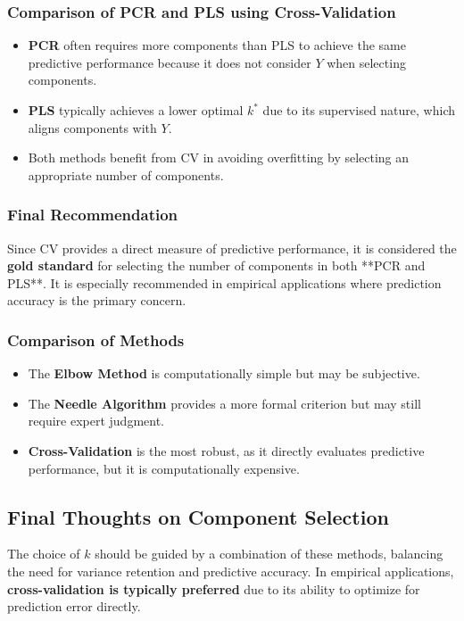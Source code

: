 \documentclass[11pt,twoside,a4paper]{article}
\begin{document}
\subsubsection{Comparison of PCR and PLS using Cross-Validation}
\begin{itemize}
    \item \textbf{PCR} often requires more components than PLS to achieve the same predictive performance because it does not consider \( Y \) when selecting components.
    \item \textbf{PLS} typically achieves a lower optimal \( k^* \) due to its supervised nature, which aligns components with \( Y \).
    \item Both methods benefit from CV in avoiding overfitting by selecting an appropriate number of components.
\end{itemize}

\subsubsection{Final Recommendation}
Since CV provides a direct measure of predictive performance, it is considered the \textbf{gold standard} for selecting the number of components in both **PCR and PLS**. It is especially recommended in empirical applications where prediction accuracy is the primary concern.

\subsubsection{Comparison of Methods}
\begin{itemize}
    \item The \textbf{Elbow Method} is computationally simple but may be subjective.
    \item The \textbf{Needle Algorithm} provides a more formal criterion but may still require expert judgment.
    \item \textbf{Cross-Validation} is the most robust, as it directly evaluates predictive performance, but it is computationally expensive.
\end{itemize}

\subsection{Final Thoughts on Component Selection}
The choice of \( k \) should be guided by a combination of these methods, balancing the need for variance retention and predictive accuracy. In empirical applications, \textbf{cross-validation is typically preferred} due to its ability to optimize for prediction error directly.
\end{document}
